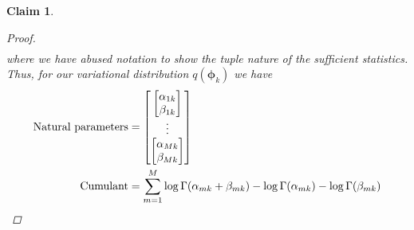 \documentclass[11pt]{article}
\newtheorem{claim}{Claim}
\begin{document}
\begin{claim}
\begin{proof}
\begin{align*}
\end{align*}
where we have abused notation to show the tuple nature of the sufficient statistics. Thus, for our variational distribution $q(\bm{\phi}_k)$ we have
\begin{align}
\text{Natural parameters} &=  			\begin{bmatrix}
				\begin{bmatrix}
				\alpha_{1k} \\ \beta_{1k} 
				\end{bmatrix} \\
				\vdots \\
				\begin{bmatrix}
				\alpha_{Mk} \\ \beta_{Mk}
				\end{bmatrix}
			\end{bmatrix} \\
\text{Cumulant} &= \sum\limits_{m=1}^M \log \Gamma(\alpha_{mk} + \beta_{mk}) - \log \Gamma(\alpha_{mk}) - \log\Gamma(\beta_{mk}) \qedhere
\end{align}
\end{proof}
\end{claim}
\end{document}
